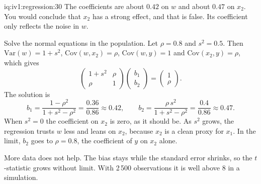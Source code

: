 \begin{solution}{iq:iv1:regression:30}
The coefficients are about $0.42$ on $w$ and about $0.47$ on $x_2$. You would conclude that $x_2$ has a strong effect, and that is false. Its coefficient only reflects the noise in $w$.

Solve the normal equations in the population. Let $\rho = 0.8$ and $s^2 = 0.5$. Then $\mathrm{Var}(w) = 1 + s^2$, $\mathrm{Cov}(w, x_2) = \rho$, $\mathrm{Cov}(w, y) = 1$ and $\mathrm{Cov}(x_2, y) = \rho$, which gives
\[
\begin{pmatrix} 1 + s^2 & \rho \\ \rho & 1 \end{pmatrix}\begin{pmatrix} b_1 \\ b_2 \end{pmatrix} = \begin{pmatrix} 1 \\ \rho \end{pmatrix}.
\]
The solution is
\[
b_1 = \frac{1 - \rho^2}{1 + s^2 - \rho^2} = \frac{0.36}{0.86} \approx 0.42, \qquad b_2 = \frac{\rho\,s^2}{1 + s^2 - \rho^2} = \frac{0.4}{0.86} \approx 0.47.
\]
When $s^2 = 0$ the coefficient on $x_2$ is zero, as it should be. As $s^2$ grows, the regression trusts $w$ less and leans on $x_2$, because $x_2$ is a clean proxy for $x_1$. In the limit, $b_2$ goes to $\rho = 0.8$, the coefficient of $y$ on $x_2$ alone.

More data does not help. The bias stays while the standard error shrinks, so the $t$-statistic grows without limit. With 2\,500 observations it is well above 8 in a simulation.

\end{solution}
